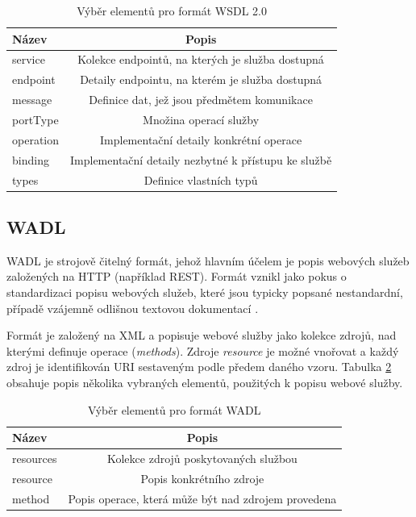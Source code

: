 \documentclass[czech,DP]{thesiskiv}
\begin{document}
\begin{table}[h]
	\centering
	\begin{tabular}{|l|c|}
		\hline
		Název & Popis \\
		\hline
		\hline
		service & Kolekce endpointů, na kterých je služba dostupná \\
		\hline
		endpoint & Detaily endpointu, na kterém je služba dostupná \\
		\hline
		message & Definice dat, jež jsou předmětem komunikace \\
		\hline
		portType & Množina operací služby \\		
		\hline
		operation & Implementační detaily konkrétní operace \\
		\hline
		binding & Implementační detaily nezbytné k přístupu ke službě \\
		\hline
		types & Definice vlastních typů \\
		\hline
		
	\end{tabular}
	\caption{Výběr elementů pro formát WSDL 2.0}
	\label{tab:wsdl-elements} 
\end{table}
 
\subsection{WADL}

WADL je strojově čitelný formát, jehož hlavním účelem je popis webových služeb založených na HTTP (například REST). Formát vznikl jako pokus o standardizaci popisu webových služeb, které jsou typicky popsané nestandardní, případě vzájemně odlišnou textovou dokumentací \cite{wadlSpec}.

Formát je založený na XML a popisuje webové služby jako kolekce zdrojů, nad kterými definuje operace (\textit{methods}). Zdroje \textit{resource} je možné vnořovat a každý zdroj je identifikován URI sestaveným podle předem daného vzoru. Tabulka \ref{tab:wadl-elements} obsahuje popis několika vybraných elementů, použitých k popisu webové služby.

\begin{table}[h]
	\centering
	\begin{tabular}{|l|c|}
		\hline
		Název & Popis \\
		\hline
		\hline
		resources & Kolekce zdrojů poskytovaných službou \\
		\hline
		resource & Popis konkrétního zdroje \\
		\hline
		method & Popis operace, která může být nad zdrojem provedena \\
		\hline
	\end{tabular}
	\caption{Výběr elementů pro formát WADL}
	\label{tab:wadl-elements} 
\end{table}
 
\end{document}
